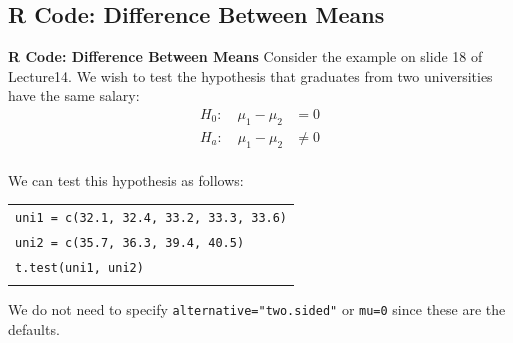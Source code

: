 \documentclass[compress]{beamer}        %
\makeatletter
\newcommand{\tcb}{\textcolor{beamer@blendedblue}}
\makeatother
\begin{document}
\subsection{R Code: Difference Between Means}
\begin{frame}{\bf \tcb{R Code: Difference Between Means}}
Consider the example on slide 18 of Lecture14. We wish to test the hypothesis that graduates from two universities have the same salary:
\begin{align*}
H_0: \quad \mu_1 - \mu_2 &= 0\\[0.2cm]
H_a: \quad \mu_1 - \mu_2 &\ne 0\\[-0.2cm]
\end{align*}

We can test this hypothesis as follows:\\[0.4cm]
\begin{tabular}{|l|}
\hline
\texttt{uni1 = c(32.1, 32.4, 33.2, 33.3, 33.6)}\\
\texttt{uni2 = c(35.7, 36.3, 39.4, 40.5)}\\
\texttt{t.test(uni1, uni2)}\\
\hline
\multicolumn{1}{c}{}\\[0.2cm]
\end{tabular}

We do not need to specify \texttt{alternative="two.sided"} or \texttt{mu=0} since these are the defaults.

\end{frame}
\end{document}
